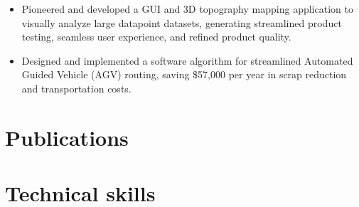 \documentclass[11pt,a4paper,sans]{moderncv} %
\begin{document}

{
\begin{itemize}
	\item Pioneered and developed a GUI and 3D topography mapping application to visually analyze large datapoint datasets, generating streamlined product testing, seamless user experience, and refined product quality.
\end{itemize}
}

{
\begin{itemize}
	\item Designed and implemented a software algorithm for streamlined Automated Guided Vehicle (AGV) routing, saving \$57,000 per year in scrap reduction and transportation costs.
\end{itemize}
}

\section{Publications}

\begin{refsection}[conference]
	\nocite{*}
	\printbibliography[title={Conferences},heading=subbibliography]
\end{refsection}
\begin{refsection}[journal]
	\nocite{*}
	\printbibliography[title={Journals},heading=subbibliography]
\end{refsection}
\begin{refsection}[workshop]
	\nocite{*}
	\printbibliography[title={Workshops},heading=subbibliography]
\end{refsection}



\section{Technical skills}
\end{document}
